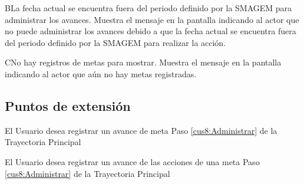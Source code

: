  \begin{UCtrayectoriaA}{B}{La fecha actual se encuentra fuera del periodo definido por la SMAGEM para administrar los avances.}
    \UCpaso[\UCsist] Muestra el mensaje  en la pantalla  indicando al actor que no puede administrar los avances debido a que la fecha actual se encuentra fuera del periodo definido por la SMAGEM para realizar la acción. 
 \end{UCtrayectoriaA}

  \begin{UCtrayectoriaA}{C}{No hay registros de metas para mostrar.}
    \UCpaso[\UCsist] Muestra el mensaje  en la pantalla  indicando al actor que aún no hay metas registradas.
 \end{UCtrayectoriaA}

\subsection{Puntos de extensión}

\UCExtensionPoint
{El Usuario desea registrar un avance de meta}
{Paso \ref{cus8:Administrar} de la Trayectoria Principal}
{}

\UCExtensionPoint
{El Usuario desea registrar un avance de las acciones de una meta}
{Paso \ref{cus8:Administrar} de la Trayectoria Principal}
{}